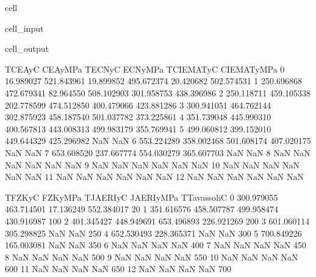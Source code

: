 \documentclass[letterpaper,10pt,english]{jupyterBook}
\begin{document}
\begin{sphinxuseclass}{cell}
\begin{sphinxVerbatimInput}
\begin{sphinxuseclass}{cell_input}
		\end{sphinxuseclass}\end{sphinxVerbatimInput}
		\begin{sphinxVerbatimOutput}
			
			\begin{sphinxuseclass}{cell_output}
				\begin{sphinxVerbatim}[commandchars=\\\{\}]
					T\PYGZus{}CEA\PYGZus{}yC    CEA\PYGZus{}yMPa    T\PYGZus{}ECN\PYGZus{}yC    ECN\PYGZus{}yMPa  T\PYGZus{}CIEMAT\PYGZus{}yC  CIEMAT\PYGZus{}yMPa  \PYGZbs{}
					0    16.989027  521.843961   19.899852  495.672374    20.420682   502.574531   
					1   250.696868  472.679341   82.964550  508.102903   301.958753   438.396986   
					2   250.118711  459.105338  202.778599  474.512850   400.479066   423.881286   
					3   300.941051  464.762144  302.875923  458.187540   501.037782   373.225861   
					4   351.739048  445.990310  400.567813  443.008313   499.983179   355.769941   
					5   499.060812  399.152010  449.644329  425.296982          NaN          NaN   
					6   553.224289  358.002468  501.608174  407.020175          NaN          NaN   
					7   653.608520  237.667774  554.030279  365.607703          NaN          NaN   
					8          NaN         NaN         NaN         NaN          NaN          NaN   
					9          NaN         NaN         NaN         NaN          NaN          NaN   
					10         NaN         NaN         NaN         NaN          NaN          NaN   
					11         NaN         NaN         NaN         NaN          NaN          NaN   
					12         NaN         NaN         NaN         NaN          NaN          NaN   
					
					T\PYGZus{}FZK\PYGZus{}yC    FZK\PYGZus{}yMPa  T\PYGZus{}JAERI\PYGZus{}yC  JAERI\PYGZus{}yMPa  T\PYGZus{}TavassoliC  \PYGZbs{}
					0   300.979055  463.714501   17.136249  552.384017            20   
					1   351.616576  458.507787  499.958474  430.916987           100   
					2   401.345427  448.949691  653.496893  226.921269           200   
					3   601.060114  305.298825         NaN         NaN           250   
					4   652.530493  228.365371         NaN         NaN           300   
					5   700.849226  165.003081         NaN         NaN           350   
					6          NaN         NaN         NaN         NaN           400   
					7          NaN         NaN         NaN         NaN           450   
					8          NaN         NaN         NaN         NaN           500   
					9          NaN         NaN         NaN         NaN           550   
					10         NaN         NaN         NaN         NaN           600   
					11         NaN         NaN         NaN         NaN           650   
					12         NaN         NaN         NaN         NaN           700   
					

\end{sphinxVerbatim}
\end{sphinxuseclass}
\end{sphinxVerbatimOutput}
\end{sphinxuseclass}
\end{document}
